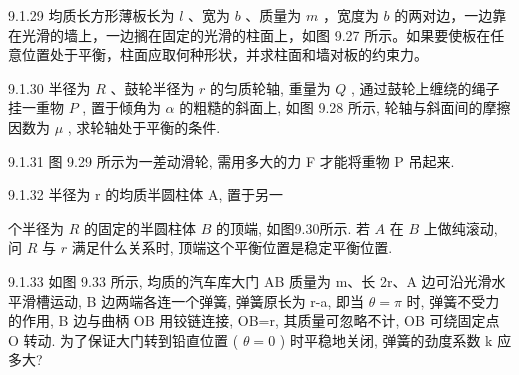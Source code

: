 \begin{problem}{9.1.29}
均质长方形薄板长为 $l$ 、宽为 $b$ 、质量为 $m$ ，宽度为 $b$ 的两对边，一边靠在光滑的墙上，一边搁在固定的光滑的柱面上，如图 9.27 所示。如果要使板在任意位置处于平衡，柱面应取何种形状，并求柱面和墙对板的约束力。
\begin{center}

\end{center}
\end{problem}
\clearpage


\begin{problem}{9.1.30}
半径为 $R$ 、鼓轮半径为 $r$ 的匀质轮轴, 重量为 $Q$ , 通过鼓轮上缠绕的绳子挂一重物 $P$ , 置于倾角为 $\alpha$ 的粗糙的斜面上, 如图 9.28 所示, 轮轴与斜面间的摩擦因数为 $\mu$ , 求轮轴处于平衡的条件.
\begin{center}

\end{center}
\end{problem}
\clearpage


\begin{problem}{9.1.31}
图 9.29 所示为一差动滑轮, 需用多大的力 F 才能将重物 P 吊起来.
\begin{center}

\end{center}
\end{problem}
\clearpage


\begin{problem}{9.1.32}
半径为 r 的均质半圆柱体 A, 置于另一

个半径为 $R$ 的固定的半圆柱体 $B$ 的顶端, 如图9.30所示. 若 $A$ 在 $B$ 上做纯滚动, 问 $R$ 与 $r$ 满足什么关系时, 顶端这个平衡位置是稳定平衡位置.
\begin{center}

\end{center}
\end{problem}
\clearpage


\begin{problem}{9.1.33}
如图 9.33 所示, 均质的汽车库大门 AB 质量为 m、长 2r、A 边可沿光滑水平滑槽运动, B 边两端各连一个弹簧, 弹簧原长为 r-a, 即当 $\theta=\pi$ 时, 弹簧不受力的作用, B 边与曲柄 OB 用铰链连接, OB=r, 其质量可忽略不计, OB 可绕固定点 O 转动. 为了保证大门转到铅直位置 ( $\theta=0$ ) 时平稳地关闭, 弹簧的劲度系数 k 应多大?
\begin{center}

\end{center}
\end{problem}
\clearpage


